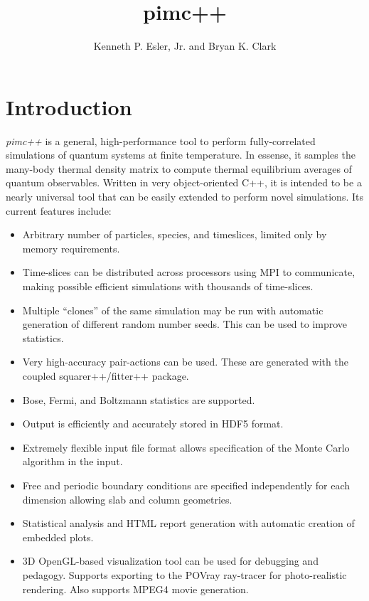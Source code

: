 \documentclass{book}
\author{Kenneth P. Esler, Jr. and Bryan K. Clark}
\title{pimc++}
\begin{document}
\maketitle
\chapter{Introduction}
{\em pimc++} is a general, high-performance tool to perform
fully-correlated simulations of quantum systems at finite temperature.
In essense, it samples the many-body thermal density matrix to compute
thermal equilibrium averages of quantum observables.  Written in very
object-oriented C++, it is intended to be a nearly universal tool that
can be easily extended to perform novel simulations.  Its current
features include:
\begin{itemize}
  \item Arbitrary number of particles, species, and timeslices,
        limited only by memory requirements.
  \item Time-slices can be distributed across processors using MPI to
        communicate, making possible efficient simulations with
        thousands of time-slices.
  \item Multiple ``clones'' of the same simulation may be run with
        automatic generation of different random number seeds.  This
        can be used to improve statistics.
  \item Very high-accuracy pair-actions can be used.  These are
        generated with the coupled squarer++/fitter++ package.
  \item Bose, Fermi, and Boltzmann statistics are supported.
  \item Output is efficiently and accurately stored in HDF5 format.
  \item Extremely flexible input file format allows specification of
        the Monte Carlo algorithm in the input.
  \item Free and periodic boundary conditions are specified
        independently for each dimension allowing slab and column
        geometries. 
  \item Statistical analysis and HTML report generation with
        automatic creation of embedded plots.
  \item 3D OpenGL-based visualization tool can be used for debugging
        and pedagogy.  Supports exporting to the POVray ray-tracer for 
        photo-realistic rendering.  Also supports MPEG4 movie generation.
\end{itemize}
\end{document}
